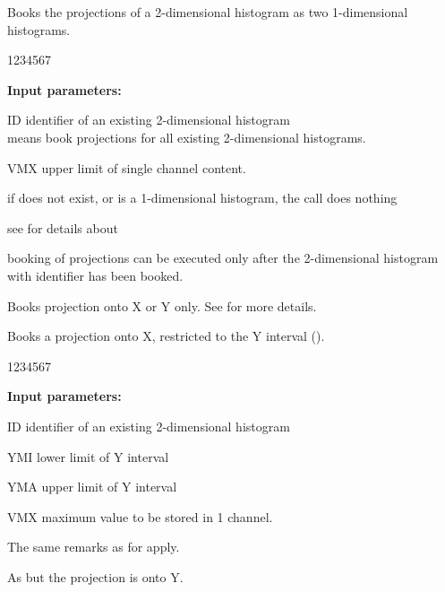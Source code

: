 

\Action Books the projections of a 2-dimensional histogram
as two 1-dimensional histograms.

\begin{DLtt}{1234567}
\item[{\rm\bf Input parameters:}]
\item[ID] identifier of an existing 2-dimensional histogram\\
           means book projections for all existing 2-dimensional
          histograms.
\item[VMX] upper limit of single channel content.
\end{DLtt}
\Remark
\begin{UL}
\item if  does not exist, or is a 1-dimensional histogram,
      the call does nothing
\item see  for details about 
\item booking of projections can be executed only after the
      2-dimensional histogram with identifier  has been booked.
\end{UL}

\Action Books projection onto X or Y only.
See  for more details.
\medskip


\Action Books a projection onto X, restricted to the Y interval
().

\begin{DLtt}{1234567}
\item[{\rm\bf Input parameters:}]
\item[ID] identifier of an existing 2-dimensional histogram
\item[YMI] lower limit of Y interval
\item[YMA] upper limit of Y interval
\item[VMX] maximum value to be stored in 1 channel.
\end{DLtt}
 
The same remarks as for  apply.
\medskip


\Action As  but the projection is onto Y.
\medskip


